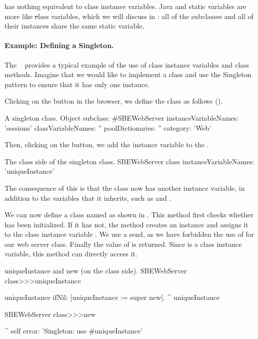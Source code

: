 \documentclass[a4paper,10pt,twoside]{book}
\begin{document}
 has nothing equivalent to class instance variables.
Java and  static variables are more like \st class variables, which we will discuss in : all of the subclasses and all of their instances share the same static variable.

\paragraph{Example: Defining a Singleton.}
The ~\cite{Alpe98a} provides a typical example of the use of class instance variables and class methods.
Imagine that we would like to implement a class  and use the Singleton pattern to ensure that it has only one instance.

Clicking on the  button in the browser, we define the class  as follows ().

\begin{classdef}[singleton]{A singleton class.}
Object subclass: #SBEWebServer
	instanceVariableNames: 'sessions'
	classVariableNames: ''
	poolDictionaries: ''
	category: 'Web'
\end{classdef}

Then, clicking on the  button, we add the instance variable  to the .

\begin{classdef}[sbewebserver]{The class side of the singleton class.}
SBEWebServer class
	instanceVariableNames: 'uniqueInstance'
\end{classdef}

The consequence of this is that the class  now has another instance variable, in addition to the variables that it inherits, such as  and .

We can now define a class  named  as shown in .
This method first checks whether  has been initialized.
If it has not, the method creates an instance and assigns it to the class instance variable .
We use a  send, as we have forbidden the use of  for our web server class.
Finally the value of  is returned.
Since  is a class instance variable, this method can directly access it.

\begin{method}[uniqueInstance]{uniqueInstance and new (on the class side).}
SBEWebServer class>>>uniqueInstance

     uniqueInstance ifNil: [uniqueInstance := super new].
     ^ uniqueInstance


SBEWebServer class>>>new

	^ self error: 'Singleton: use #uniqueInstance'
\end{method}
\end{document}

